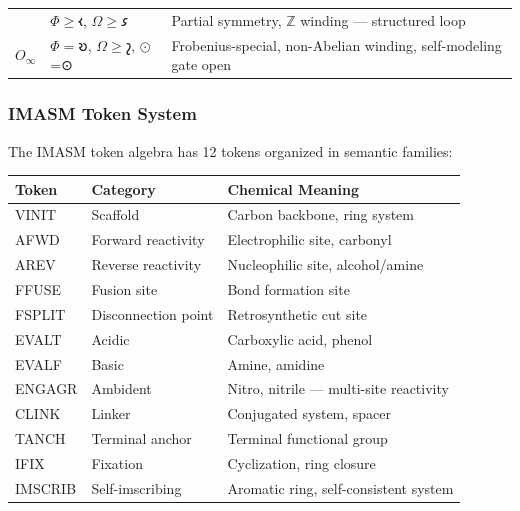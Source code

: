 \begin{longtable}[]{@{}lll@{}}
\begin{minipage}[t]{0.21\columnwidth}
\end{minipage} & \begin{minipage}[t]{0.39\columnwidth}\raggedright
\(\Phi \geq 𐑬\), \(\Omega \geq 𐑭\)\strut
\end{minipage} & \begin{minipage}[t]{0.32\columnwidth}\raggedright
Partial symmetry, \(\mathbb{Z}\) winding --- structured loop\strut
\end{minipage}\tabularnewline
\begin{minipage}[t]{0.21\columnwidth}\raggedright
\(O_∞\)\strut
\end{minipage} & \begin{minipage}[t]{0.39\columnwidth}\raggedright
\(\Phi = 𐑹\), \(\Omega \geq 𐑟\), \(\odot\)=⊙\strut
\end{minipage} & \begin{minipage}[t]{0.32\columnwidth}\raggedright
Frobenius-special, non-Abelian winding, self-modeling gate open\strut
\end{minipage}\tabularnewline
\bottomrule
\end{longtable}

\hypertarget{imasm-token-system}{%
\subsubsection{IMASM Token System}\label{imasm-token-system}}

The IMASM token algebra has 12 tokens organized in semantic families:

\begin{longtable}[]{@{}lll@{}}
\toprule
Token & Category & Chemical Meaning\tabularnewline
\midrule
\endhead
VINIT & Scaffold & Carbon backbone, ring system\tabularnewline
AFWD & Forward reactivity & Electrophilic site, carbonyl\tabularnewline
AREV & Reverse reactivity & Nucleophilic site,
alcohol/amine\tabularnewline
FFUSE & Fusion site & Bond formation site\tabularnewline
FSPLIT & Disconnection point & Retrosynthetic cut site\tabularnewline
EVALT & Acidic & Carboxylic acid, phenol\tabularnewline
EVALF & Basic & Amine, amidine\tabularnewline
ENGAGR & Ambident & Nitro, nitrile --- multi-site
reactivity\tabularnewline
CLINK & Linker & Conjugated system, spacer\tabularnewline
TANCH & Terminal anchor & Terminal functional group\tabularnewline
IFIX & Fixation & Cyclization, ring closure\tabularnewline
IMSCRIB & Self-imscribing & Aromatic ring, self-consistent
system\tabularnewline
\bottomrule
\end{longtable}

